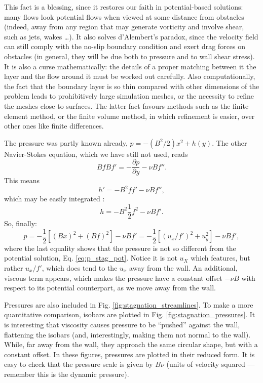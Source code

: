This fact is a blessing, since it restores our faith in
potential-based solutions: many flows look potential flows when viewed
at some distance from obstacles (indeed, away from any region that may
generate vorticity and involve shear, such as jets, wakes \ldots). It
also solves d'Alembert's paradox, since the velocity field can still
comply with the no-slip boundary condition and exert drag forces on
obstacles (in general, they will be due both to pressure and to wall
shear stress). It is also a curse mathematically: the details of a
proper matching between it the layer and the flow around it must be
worked out carefully. Also computationally, the fact that the boundary
layer is so thin compared with other dimensions of the problem leads
to prohibitively large simulation meshes, or the necessity to refine
the meshes close to surfaces. The latter fact favours methods such as
the finite element method, or the finite volume method, in which
refinement is easier, over other ones like finite differences.

The pressure was partly known already, $p=-(B^2/2) x^2 + h(y)$. The other
Navier-Stokes equation, which we have still not used, reads
\[
B f B f'  =  - \frac{\partial p}{\partial y} -
\nu B  f'' .
\]
This means
\[
h' = - B^2 f f' - \nu B f'' ,
\]
which may be easily integrated :
\[
h = -B^2 \frac12 f^2  - \nu B f' .
\]
So, finally:
\[
p = -\frac{1}{2} \left[
  (B x)^2 +
  (B f)^2
  \right]  - \nu B f' =
 -\frac{1}{2} \left[
  (u_x / f' )^2 +
  u_y^2
  \right]  - \nu B f' ,
 \]
 where the last equality shows that the pressure is not so different
 from the potential solution, Eq. \ref{eq:p_stag_pot}.
%
 Notice it is not $u_X$ which features, but rather $u_x/f'$, which
 does tend to the $u_x$ away from the wall. An additional, viscous
 term appears, which makes the pressure have a constant offset
 $-\nu B$ with respect to its potential counterpart, as we move
 away from the wall.

 Pressures are also included in Fig.
 \ref{fig:stagnation_streamlines}. To make a more quantitative
 comparison, isobars are plotted in
 Fig. \ref{fig:stagnation_pressures}. It is interesting that viscosity
 causes pressure to be ``pushed'' against the wall, flattening the
 isobars (and, interestingly, making them not normal to the
 wall). While, far away from the wall, they approach the same circular
 shape, but with a constant offset. In these figures, pressures are
 plotted in their reduced form. It is easy to check that the pressure
 scale is given by $B \nu$ (units of velocity squared --- remember this
 is the dynamic pressure).

